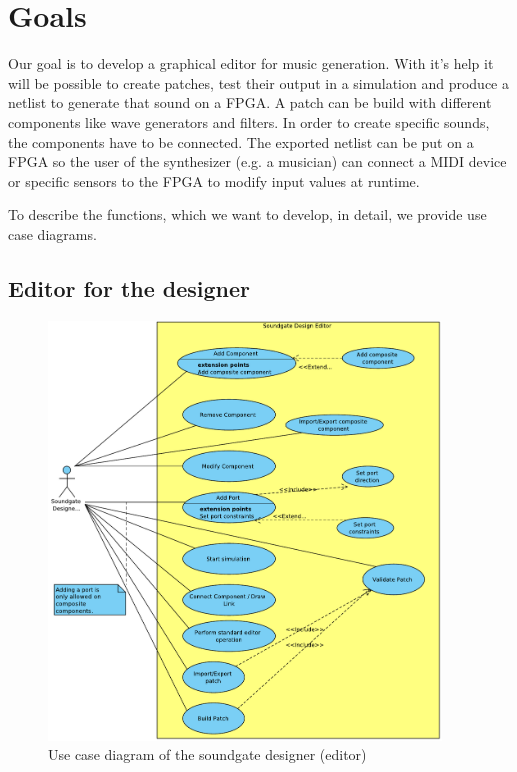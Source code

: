 \chapter{Goals}
Our goal is to develop a graphical editor for music generation. With it's help it will be possible to create patches, test their output in a simulation and produce a netlist to generate that sound on a FPGA. A patch can be build with different components like wave generators and filters. In order to create specific sounds, the components have to be connected. The exported netlist can be put on a FPGA so the user of the synthesizer (e.g. a musician) can connect a MIDI device or specific sensors to the FPGA to modify input values at runtime. 

To describe the functions, which we want to develop, in detail, we provide use case diagrams.

\section{Editor for the designer}

	\begin{figure}[!h]
		\centering
			\includegraphics[width=0.93\textwidth]{images/Soundgate_Designer.pdf}
		\caption{Use case diagram of the soundgate designer (editor)}
		\label{fig:Soundgate_Designer}
	\end{figure}
	
